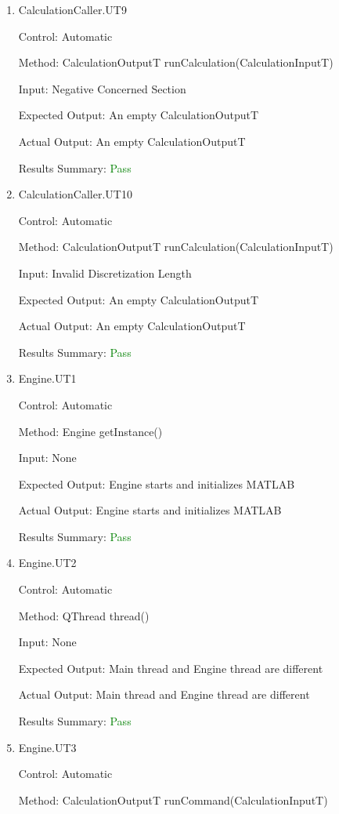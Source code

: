 \documentclass[12pt, titlepage]{article}
\begin{document}
\begin{enumerate}
  \item {CalculationCaller.UT9}

  Control: Automatic

  Method: CalculationOutputT runCalculation(CalculationInputT)

  Input: Negative Concerned Section

  Expected Output: An empty CalculationOutputT

  Actual Output: An empty CalculationOutputT

  Results Summary: \textcolor{green} {Pass}

  \item {CalculationCaller.UT10}

  Control: Automatic

  Method: CalculationOutputT runCalculation(CalculationInputT)

  Input: Invalid Discretization Length

  Expected Output: An empty CalculationOutputT

  Actual Output: An empty CalculationOutputT

  Results Summary: \textcolor{green} {Pass}

  \item {Engine.UT1}

  Control: Automatic

  Method: Engine getInstance()

  Input: None

  Expected Output: Engine starts and initializes MATLAB

  Actual Output: Engine starts and initializes MATLAB

  Results Summary: \textcolor{green} {Pass}

  \item {Engine.UT2}

  Control: Automatic

  Method: QThread thread()

  Input: None

  Expected Output: Main thread and Engine thread are different

  Actual Output: Main thread and Engine thread are different

  Results Summary: \textcolor{green} {Pass}

  \item {Engine.UT3}

  Control: Automatic

  Method: CalculationOutputT runCommand(CalculationInputT)


\end{enumerate}
\end{document}

